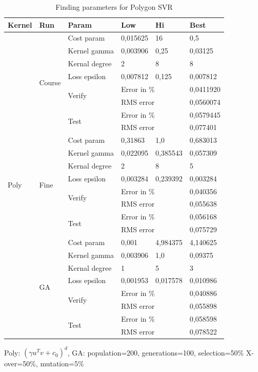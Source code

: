 \begin{table}[H]
\begin{threeparttable}
\begin{tabular}{ | l | l | l | l | l | l | } 
\hline 
Kernel & Run & Param & Low & Hi & Best \\
\hline 
\multirow{24}{*}{Poly} %
& \multirow{8}{*}{Course} & Cost param & 0,015625 & 16 & 0,5 \\
& & Kernel gamma & 0,003906 & 0,25 & 0,03125 \\  
& & Kernal degree & 2 & 8 & 8 \\
& & Loss epsilon & 0,007812 & 0,125 & 0,007812 \\ 
\cline{3-6}
& & \multirow{2}{*}{Verify} & \multicolumn{2}{l|}{Error in \%} & 0,0411920 \\
& & & \multicolumn{2}{l|}{RMS error} & 0,0560074 \\
\cline{3-6}
& & \multirow{2}{*}{Test} & \multicolumn{2}{l|}{Error in \%} & 0,0579445 \\
& & & \multicolumn{2}{l|}{RMS error} & 0,077401 \\
\cline{2-6}
& \multirow{8}{*}{Fine} & Cost param & 0,31863 & 1,0 & 0,683013 \\
& & Kernel gamma & 0,022095 & 0,385543 & 0,057309 \\  
& & Kernal degree & 2 & 8 & 5 \\
& & Loss epsilon & 0,003284 & 0,239392 & 0,003284 \\
\cline{3-6}
& & \multirow{2}{*}{Verify} & \multicolumn{2}{l|}{Error in \%} & 0,040356 \\
& & & \multicolumn{2}{l|}{RMS error} & 0,055638 \\
\cline{3-6}
& & \multirow{2}{*}{Test} & \multicolumn{2}{l|}{Error in \%} & 0,056168 \\
& & & \multicolumn{2}{l|}{RMS error} & 0,075729 \\
\cline{2-6}
& \multirow{8}{*}{GA} & Cost param & 0,001 & 4,984375 & 4,140625 \\
& & Kernel gamma & 0,003906 & 1,0 & 0,09375 \\  
& & Kernal degree & 1 & 5 & 3 \\
& & Loss epsilon & 0,001953 & 0,017578 & 0,010986 \\
\cline{3-6}
& & \multirow{2}{*}{Verify} & \multicolumn{2}{l|}{Error in \%} & 0,040886 \\
& & & \multicolumn{2}{l|}{RMS error} & 0,055898 \\
\cline{3-6}
& & \multirow{2}{*}{Test} & \multicolumn{2}{l|}{Error in \%} & 0,058598 \\
& & & \multicolumn{2}{l|}{RMS error} & 0,078522 \\
\hline
\end{tabular}
\begin{tablenotes}
      \small
      \item Poly: $(\gamma u^{T} v + c_{0})^{d}$, GA: population=200, generations=100, selection=50\% X-over=50\%, mutation=5\%
\end{tablenotes}
\caption{Finding parameters for Polygon SVR}
\label{tab:params_svr_poly}
\end{threeparttable}
\end{table}
